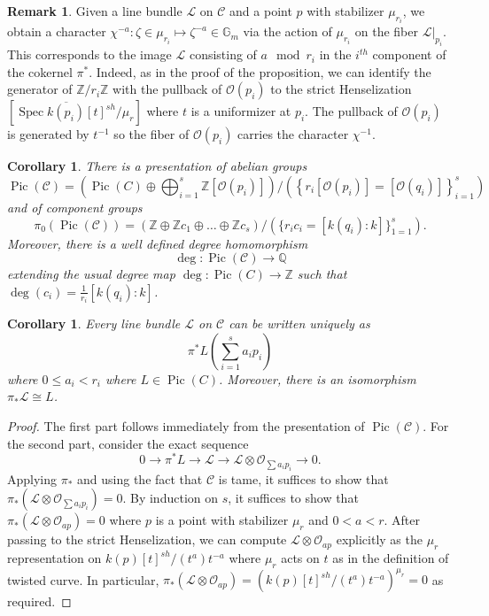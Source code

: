 \documentclass[a4paper,12pt]{amsart}
\newtheorem{cor}[thm]{Corollary}
\theoremstyle{definition}
\newtheorem{rmk}[thm]{Remark}
\newcommand{\bG}{\mathbb{G}}
\newcommand{\cO}{\mathcal{O}}
\newcommand{\cC}{\mathcal{C}}
\newcommand{\cL}{\mathcal{L}}
\newcommand{\Z}{\mathbb{Z}}
\newcommand{\Q}{\mathbb{Q}}
\DeclareMathOperator{\Spec}{Spec}
\DeclareMathOperator{\Pic}{Pic}
\begin{document}
	\begin{rmk}\label{rmk:character} Given a line bundle $\cL$ on $\cC$ and a point $p$ with stabilizer $\mu_{r_i}$, we obtain a character $\chi^{-a} : \zeta \in \mu_{r_i} \mapsto \zeta^{-a} \in \bG_m$ via the action of $\mu_{r_i}$ on the fiber $\cL|_{p_i}$. This corresponds to the image $\cL$ consisting of $a \mod r_i$ in the $i^{th}$ component of the cokernel $\pi^*$. Indeed, as in the proof of the proposition, we can identify the generator of $\Z/r_i\Z$ with the pullback of $\cO(p_i)$ to the strict Henselization $[\Spec \overline{k(p_i)}[t]^{sh}/\mu_r]$ where $t$ is a uniformizer at $p_i$. The pullback of $\cO(p_i)$ is generated by $t^{-1}$ so the fiber of $\cO(p_i)$ carries the character $\chi^{-1}$. 
	\end{rmk}
	
	\begin{cor} There is a presentation of abelian groups
		$$
		\Pic(\cC) = \left(\Pic(C) \oplus \bigoplus_{i = 1}^s \Z [\cO(p_i)] \right)/ \left( \left\{r_i[\cO(p_i)] = [\cO(q_i)] \right\}_{i = 1}^s \right)
		$$
		and of component groups
		$$
		\pi_0(\Pic(\cC)) = (\Z \oplus \Z c_1 \oplus \ldots \oplus \Z c_s)/(\{r_ic_i =  [k(q_i):k]\}_{1 = 1}^s).
		$$
		Moreover, there is a well defined degree homomorphism
		$$
		\deg : \Pic(\cC) \to \Q
		$$
		extending the usual degree map $\deg : \Pic(C) \to \Z$ such that $\deg(c_i) = \frac{1}{r_i}[k(q_i):k]$. 
	\end{cor}
	
	\begin{cor}\label{cor:push:round:down} Every line bundle $\cL$ on $\cC$ can be written uniquely as 
		$$
		\pi^*L\left( \sum_{i = 1}^s a_i p_i \right)
		$$
		where $0 \le a_i < r_i$ where $L \in \Pic(C)$. Moreover, there is an isomorphism $\pi_*\cL \cong L$. 
	\end{cor}
	\begin{proof} The first part follows immediately from the presentation of $\Pic(\cC)$. For the second part, consider the exact sequence 
		$$
		0 \to \pi^*L \to \cL \to \cL \otimes \cO_{\sum a_i p_i} \to 0. 
		$$
		Applying $\pi_*$ and using the fact that $\cC$ is tame, it suffices to show that $\pi_* (\cL \otimes \cO_{\sum a_i p_i}) = 0$. By induction on $s$, it suffices to show that $\pi_*(\cL \otimes \cO_{ap}) = 0$ where $p$ is a point with stabilizer $\mu_r$ and $0 < a < r$. After passing to the strict Henselization, we can compute $\cL \otimes \cO_{ap}$ explicitly as the $\mu_r$ representation on $k(p)[t]^{sh}/(t^a)t^{-a}$ where $\mu_r$ acts on $t$ as in the definition of twisted curve. In particular, $\pi_*(\cL \otimes \cO_{ap}) = (k(p)[t]^{sh}/(t^a)t^{-a})^{\mu_r} = 0$ as required. 
	\end{proof}
	
\end{document}
